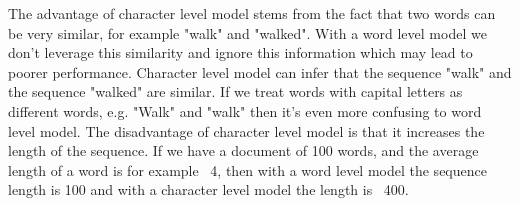 The advantage of character level model stems from the fact that two words can be very similar, for example "walk" and "walked". With a word level model we don't leverage this similarity and ignore this information which may lead to poorer performance. Character level model can infer that the sequence "walk" and the sequence "walked" are similar. If we treat words with capital letters as different words, e.g. "Walk" and "walk" then it's even more confusing to word level model.
The disadvantage of character level model is that it increases the length of the sequence. If we have a document of 100 words, and the average length of a word is for example ~4, then with a word level model the sequence length is 100 and with a character level model the length is ~400. 